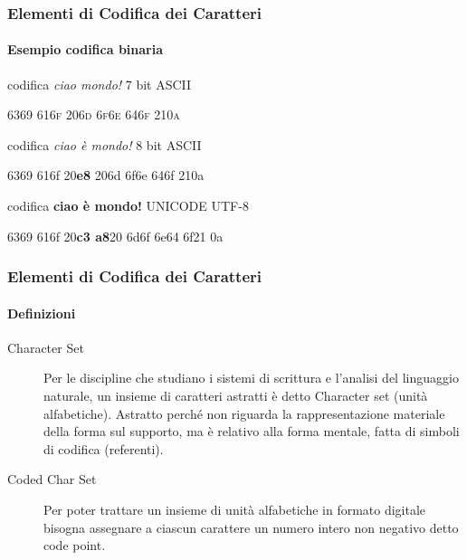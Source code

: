 \begin{frame}
	\frametitle{Elementi di Codifica dei Caratteri}
	\framesubtitle{Esempio codifica binaria}
	\addtocounter{nframe}{1}

	\begin{block}{codifica \textit{ciao mondo!} 7 bit ASCII}
		\begin{center}
			\textsc{6369 616f 206d 6f6e 646f 210a}
		\end{center}
	\end{block}

	\begin{block}{codifica \textit{ciao è mondo!} 8 bit ASCII}
		\begin{center}
			\textmd{6369 616f 20\textbf{e8} 206d 6f6e 646f 210a       }
		\end{center}
	\end{block}

	\begin{block}{codifica \textbf{ciao è mondo!} UNICODE UTF-8}
		\begin{center}
			6369 616f 20\textbf{c3 a8}20 6d6f 6e64 6f21 0a
		\end{center}
	\end{block}

\end{frame}

\begin{frame}
	\frametitle{Elementi di Codifica dei Caratteri}
	\framesubtitle{Definizioni}
	\addtocounter{nframe}{1}


	\begin{description}
		\item [Character Set] Per le discipline che studiano i sistemi di scrittura e l'analisi del linguaggio naturale, un insieme di caratteri astratti è detto Character set (unità alfabetiche). Astratto perché non riguarda la rappresentazione materiale della forma sul supporto, ma è relativo alla forma mentale, fatta di simboli di codifica (referenti).
		\item [Coded Char Set] Per poter trattare un insieme di unità alfabetiche in formato digitale bisogna assegnare a ciascun carattere un numero intero non negativo detto code point.
		
	\end{description}

\end{frame}

